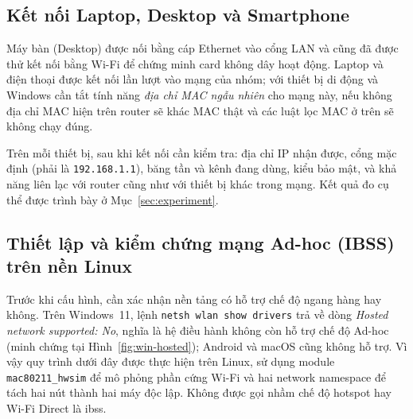 \subsection{Kết nối Laptop, Desktop và Smartphone}
Máy bàn (Desktop) được nối bằng cáp Ethernet vào cổng LAN và cũng đã được thử
kết nối bằng Wi-Fi để chứng minh card không dây hoạt động. Laptop và điện thoại
được kết nối lần lượt vào mạng của nhóm; với thiết bị di động và Windows cần tắt
tính năng \emph{địa chỉ MAC ngẫu nhiên} cho mạng này, nếu không địa chỉ MAC hiện
trên router sẽ khác MAC thật và các luật lọc MAC ở trên sẽ không chạy đúng.

Trên mỗi thiết bị, sau khi kết nối cần kiểm tra: địa chỉ IP nhận được, cổng mặc
định (phải là \texttt{192.168.1.1}), băng tần và kênh đang dùng, kiểu bảo mật, và
khả năng liên lạc với router cũng như với thiết bị khác trong mạng. Kết quả đo
cụ thể được trình bày ở Mục~\ref{sec:experiment}.

\subsection{Thiết lập và kiểm chứng mạng Ad-hoc (IBSS) trên nền Linux}
\label{sec:adhoc-config}

Trước khi cấu hình, cần xác nhận nền tảng có hỗ trợ chế độ ngang hàng hay không.
Trên Windows~11, lệnh \texttt{netsh wlan show drivers} trả về dòng
\emph{Hosted network supported: No}, nghĩa là hệ điều hành không còn hỗ trợ chế
độ Ad-hoc (minh chứng tại Hình~\ref{fig:win-hosted}); Android và macOS cũng
không hỗ trợ. Vì vậy quy trình dưới đây được thực hiện trên Linux, sử dụng module
\texttt{mac80211\_hwsim} để mô phỏng phần cứng Wi-Fi và hai network namespace để
tách hai nút thành hai máy độc lập. Không được gọi nhầm chế độ hotspot hay
Wi-Fi Direct là \ac{ibss}.

